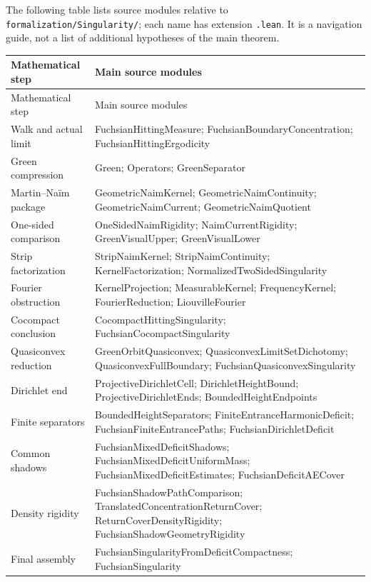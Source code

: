 \documentclass[11pt,a4paper]{article}
\theoremstyle{definition}
\theoremstyle{remark}
\numberwithin{equation}{section}
\begin{document}
The following table lists source modules relative to
\texttt{formalization/Singularity/}; each name has extension
\texttt{.lean}. It is a navigation guide, not a list of additional
hypotheses of the main theorem.
\small
\begin{longtable}{@{}>{\raggedright\arraybackslash}p{}>{\raggedright\arraybackslash}p{}@{}}
\toprule
Mathematical step & Main source modules\\\midrule
\endfirsthead
\toprule Mathematical step & Main source modules\\\midrule
\endhead
Walk and actual limit & FuchsianHittingMeasure; FuchsianBoundaryConcentration;
FuchsianHittingErgodicity\\[5pt]
Green compression & Green; Operators; GreenSeparator\\[5pt]
Martin--Na\"im package & GeometricNaimKernel; GeometricNaimContinuity;
GeometricNaimCurrent; GeometricNaimQuotient\\[5pt]
One-sided comparison & OneSidedNaimRigidity; NaimCurrentRigidity;
GreenVisualUpper; GreenVisualLower\\[5pt]
Strip factorization & StripNaimKernel; StripNaimContinuity;
KernelFactorization; NormalizedTwoSidedSingularity\\[5pt]
Fourier obstruction & KernelProjection; MeasurableKernel; FrequencyKernel;
FourierReduction; LiouvilleFourier\\[5pt]
Cocompact conclusion & CocompactHittingSingularity; FuchsianCocompactSingularity\\[5pt]
Quasiconvex reduction & GreenOrbitQuasiconvex; QuasiconvexLimitSetDichotomy;
QuasiconvexFullBoundary; FuchsianQuasiconvexSingularity\\[5pt]
Dirichlet end & ProjectiveDirichletCell; DirichletHeightBound;
ProjectiveDirichletEnds; BoundedHeightEndpoints\\[5pt]
Finite separators & BoundedHeightSeparators; FiniteEntranceHarmonicDeficit;
FuchsianFiniteEntrancePaths; FuchsianDirichletDeficit\\[5pt]
Common shadows & FuchsianMixedDeficitShadows; FuchsianMixedDeficitUniformMass;
FuchsianMixedDeficitEstimates; FuchsianDeficitAECover\\[5pt]
Density rigidity & FuchsianShadowPathComparison; TranslatedConcentrationReturnCover;
ReturnCoverDensityRigidity; FuchsianShadowGeometryRigidity\\[5pt]
Final assembly & FuchsianSingularityFromDeficitCompactness;
FuchsianSingularity\\
\bottomrule
\end{longtable}
\normalsize
\end{document}
